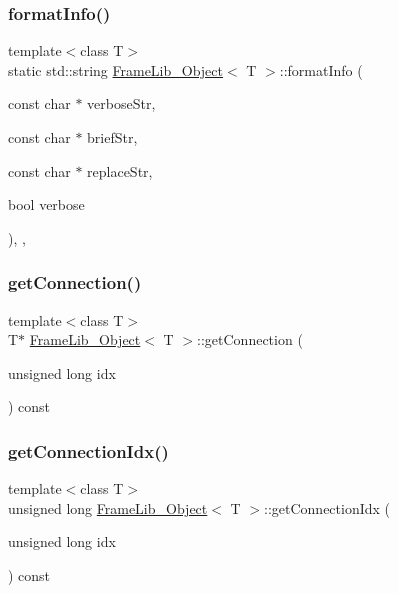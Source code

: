 \subsubsection{\texorpdfstring{format\+Info()}{formatInfo()}\hspace{0.1cm}{\footnotesize\ttfamily [3/3]}}
{\footnotesize\ttfamily template$<$class T$>$ \\
static std\+::string \hyperlink{class_frame_lib___object}{Frame\+Lib\+\_\+\+Object}$<$ T $>$\+::format\+Info (\begin{DoxyParamCaption}\item[{const char $\ast$}]{verbose\+Str,  }\item[{const char $\ast$}]{brief\+Str,  }\item[{const char $\ast$}]{replace\+Str,  }\item[{bool}]{verbose }\end{DoxyParamCaption})\hspace{0.3cm}{\ttfamily [inline]}, {\ttfamily [static]}, {\ttfamily [protected]}}

\mbox{\label{class_frame_lib___object_ad660fd98d11c9a91bf9131f35ba365a6}} 
\subsubsection{\texorpdfstring{get\+Connection()}{getConnection()}}
{\footnotesize\ttfamily template$<$class T$>$ \\
T$\ast$ \hyperlink{class_frame_lib___object}{Frame\+Lib\+\_\+\+Object}$<$ T $>$\+::get\+Connection (\begin{DoxyParamCaption}\item[{unsigned long}]{idx }\end{DoxyParamCaption}) const\hspace{0.3cm}{\ttfamily [inline]}}

\mbox{\label{class_frame_lib___object_a40383ebb4672e2bb1bd7ad41da14e967}} 
\subsubsection{\texorpdfstring{get\+Connection\+Idx()}{getConnectionIdx()}}
{\footnotesize\ttfamily template$<$class T$>$ \\
unsigned long \hyperlink{class_frame_lib___object}{Frame\+Lib\+\_\+\+Object}$<$ T $>$\+::get\+Connection\+Idx (\begin{DoxyParamCaption}\item[{unsigned long}]{idx }\end{DoxyParamCaption}) const\hspace{0.3cm}{\ttfamily [inline]}}

